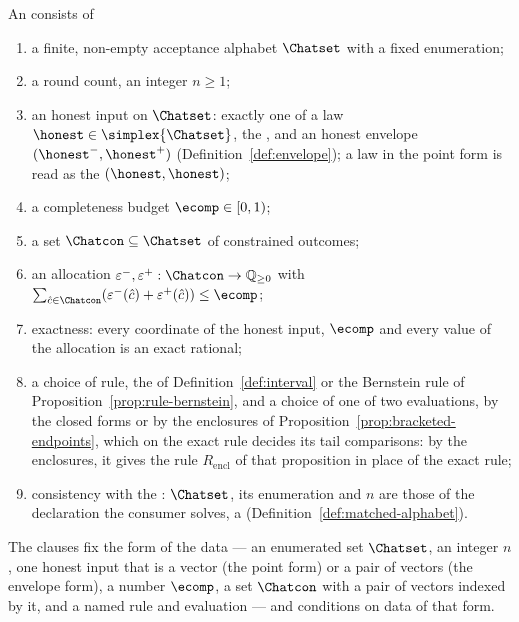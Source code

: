 \begin{definition}
An  consists of
\begin{enumerate}[label=(\roman*),leftmargin=2.2em]
\item a finite, non-empty acceptance alphabet $\Chatset$ with a fixed
enumeration;
\item a round count, an integer $n\ge1$;
\item an honest input on $\Chatset$: exactly one of a law
$\honest\in\simplex{\Chatset}$, the , and an honest envelope
$({\honest}^{-},{\honest}^{+})$ (Definition~\ref{def:envelope}); a law in the
point form is read as the  $(\honest,\honest)$;
\item a completeness budget $\ecomp\in[0,1)$;
\item a set $\Chatcon\subseteq\Chatset$ of constrained outcomes;
\item an allocation
$\varepsilon^{-},\varepsilon^{+}:\Chatcon\to\mathbb{Q}_{\ge0}$ with
$\sum_{\hat c\in\Chatcon}(\varepsilon^{-}(\hat c)+\varepsilon^{+}(\hat
c))\le\ecomp$;
\item exactness: every coordinate of the honest input, $\ecomp$ and every
value of the allocation is an exact rational;
\item a choice of rule, the  of
Definition~\ref{def:interval} or the Bernstein rule of
Proposition~\ref{prop:rule-bernstein}, and a choice of one of two
evaluations, by the closed forms or by the enclosures of
Proposition~\ref{prop:bracketed-endpoints}, which on the exact rule decides
its tail comparisons: by the enclosures, it gives the rule
$R_{\mathrm{encl}}$ of that proposition in place of the exact rule;
\item consistency with the : $\Chatset$, its enumeration and
$n$ are those of the declaration the consumer solves, a
 (Definition~\ref{def:matched-alphabet}).
\end{enumerate}
The clauses fix the form of the data --- an enumerated set $\Chatset$, an
integer $n$, one honest input that is a vector (the point form) or a pair of
vectors (the envelope form), a number $\ecomp$, a set $\Chatcon$ with a pair
of vectors indexed by it, and a named rule and evaluation --- and conditions
on data of that form.


\end{definition}
